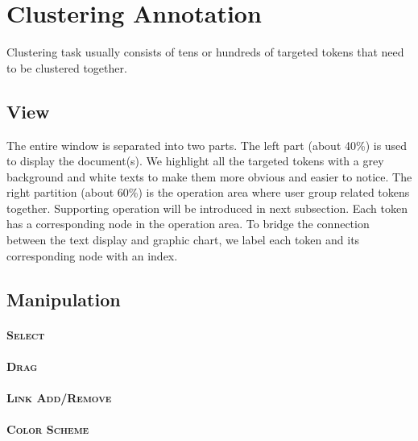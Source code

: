 \section{Clustering Annotation}

Clustering task usually consists of tens or hundreds of targeted tokens that need to be clustered together. 

\subsection{View}

The entire window is separated into two parts. The left part (about 40\%) is used to display the document(s). We highlight all the targeted tokens with a grey background and white texts to make them more obvious and easier to notice. The right partition (about 60\%) is the operation area where user group related tokens together. Supporting operation will be introduced in next subsection. Each token has a corresponding node in the operation area. To bridge the connection between the text display and graphic chart, we label each token and its corresponding node with an index.

\subsection{Manipulation}

\paragraph{\textsc{Select}\\}

\paragraph{\textsc{Drag}\\}

\paragraph{\textsc{Link Add/Remove}\\}

\paragraph{\textsc{Color Scheme}\\}